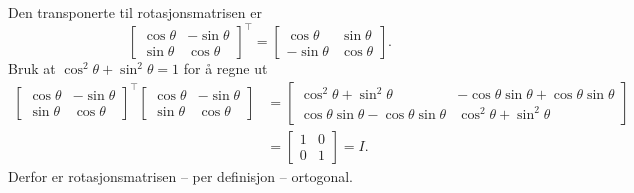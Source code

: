 \documentclass[notitlepage,a4paper,12pt,norsk]{IMFeksamen}
\newcommand{\tr}{^\top}
\newcommand{\0}{\V{0}}
\newcommand{\oppgslutt}{
\begin{center}
\pgfornament[width=6cm]{88}
\end{center}
}
\newenvironment{losning}{\begin{oppgave}}{\oppgslutt\end{oppgave}}
\begin{document}
\begin{losning}
Den transponerte til rotasjonsmatrisen er
\[
\begin{bmatrix}
\cos \theta  & -\sin \theta  \\  \sin \theta & \cos \theta 
\end{bmatrix}\tr 
=
\begin{bmatrix}
\cos \theta  & \sin \theta  \\  -\sin \theta & \cos \theta 
\end{bmatrix}.
\]
Bruk at $\cos ^2 \theta +\sin^2 \theta =1$ for å regne ut
\begin{align*}
\begin{bmatrix}
\cos \theta  & -\sin \theta  \\  \sin \theta & \cos \theta 
\end{bmatrix}\tr 
\begin{bmatrix}
\cos \theta  & -\sin \theta  \\  \sin \theta & \cos \theta 
\end{bmatrix}
&=
\begin{bmatrix}
\cos^2 \theta +\sin^2 \theta   & -\cos\theta \sin \theta  +\cos\theta \sin \theta \\  
\cos\theta \sin \theta  -\cos\theta \sin \theta& \cos^2 \theta +\sin^2\theta
\end{bmatrix}\\
&=
\begin{bmatrix}
1 & 0 \\
0 & 1
\end{bmatrix}
=I.
\end{align*}
Derfor er rotasjonsmatrisen -- per definisjon -- ortogonal.


\end{losning}
\end{document}
